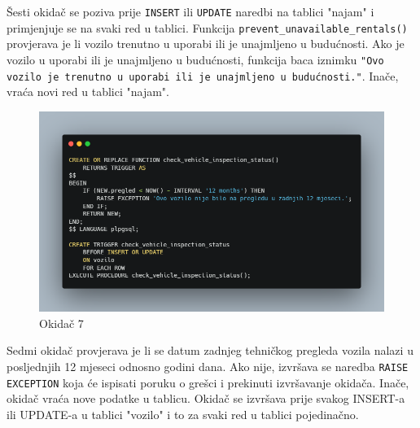 \documentclass[]{foi} %
\begin{document}
Šesti okidač se poziva prije \texttt{INSERT} ili \texttt{UPDATE} naredbi na tablici "najam" i primjenjuje se na svaki red u tablici. Funkcija \texttt{prevent\_unavailable\_rentals()} provjerava je li vozilo trenutno u uporabi ili je unajmljeno u budućnosti. Ako je vozilo u uporabi ili je unajmljeno u budućnosti, funkcija baca iznimku \texttt{"Ovo vozilo je trenutno u uporabi ili je unajmljeno u budućnosti."}. Inače, vraća novi red u tablici "najam".
\newpage

\begin{figure}[!ht]
    \centering
    \includegraphics[width=1\textwidth]{slike/7.png}
    \caption{Okidač 7}
    \label{fig:sedmi}
\end{figure}

Sedmi okidač provjerava je li se datum zadnjeg tehničkog pregleda vozila nalazi u posljednjih 12 mjeseci odnosno godini dana. Ako nije, izvršava se naredba \texttt{RAISE EXCEPTION} koja će ispisati poruku o grešci i prekinuti izvršavanje okidača. Inače, okidač vraća nove podatke u tablicu. Okidač se izvršava prije svakog INSERT-a ili UPDATE-a u tablici "vozilo" i to za svaki red u tablici pojedinačno.
\newpage
\end{document}
